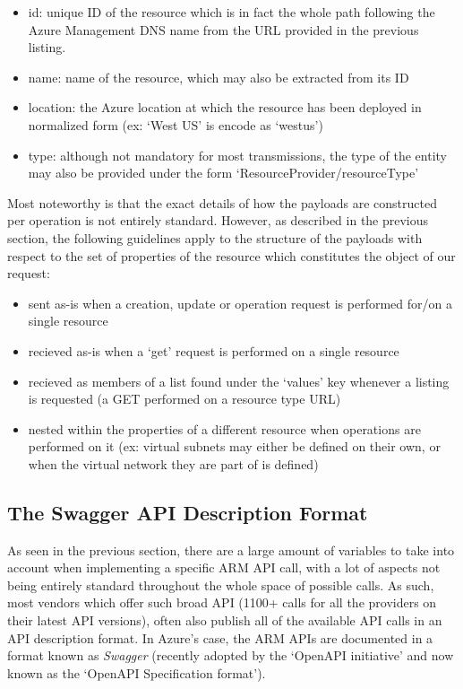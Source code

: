 \documentclass[11pt]{report}
\begin{document}
\begin{itemize}
    \item{id}: unique ID of the resource which is in fact the whole path
        following the Azure Management DNS name from the URL provided in the
        previous listing.
    \item{name}: name of the resource, which may also be extracted from its ID
    \item{location}: the Azure location at which the resource has been
        deployed in normalized form (ex: `West US' is encode as `westus')
    \item{type}: although not mandatory for most transmissions, the type of the
        entity may also be provided under the form
        `ResourceProvider/resourceType'
\end{itemize}

Most noteworthy is that the exact details of how the payloads are constructed
per operation is not entirely standard. However, as described in the previous
section, the following guidelines apply to the structure of the payloads with
respect to the set of properties of the resource which constitutes the object
of our request:

\begin{itemize}
    \item{} sent as-is when a creation, update or operation request is
        performed for/on a single resource
    \item{} recieved as-is when a `get' request is performed on a single
        resource
    \item{} recieved as members of a list found under the `values' key
        whenever a listing is requested (a GET performed on a resource type URL)
    \item{} nested within the properties of a different resource when
        operations are performed on it (ex: virtual subnets may either
        be defined on their own, or when the virtual network they are part of
        is defined)
\end{itemize}

\subsection{The Swagger API Description Format}

As seen in the previous section, there are a large amount of variables to take
into account when implementing a specific ARM API call, with a lot of aspects
not being entirely standard throughout the whole space of possible calls. As
such, most vendors which offer such broad API (1100+ calls for all the
providers on their latest API versions), often also publish all of the
available API calls in an API description format. In Azure's case, the ARM APIs
are documented in a format known as \textit{Swagger} (recently adopted by the
`OpenAPI initiative' and now known as the `OpenAPI Specification format').
\end{document}
